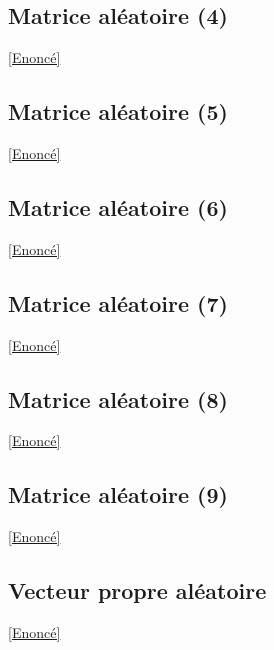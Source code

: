 \documentclass[8pt]{book}
\begin{document}
	\subsection{Matrice aléatoire (4)}
	\label{Matrice aléatoire 4 corrigé}
	\textcolor{blue}{\hyperref[Matrice aléatoire 4]{[Enoncé]}}\\
	
	\subsection{Matrice aléatoire (5)}
	\label{Matrice aléatoire 5 corrigé}
	\textcolor{blue}{\hyperref[Matrice aléatoire 5]{[Enoncé]}}\\
	
	\subsection{Matrice aléatoire (6)}
	\label{Matrice aléatoire 6 corrigé}
	\textcolor{blue}{\hyperref[Matrice aléatoire 6]{[Enoncé]}}\\
	
	\subsection{Matrice aléatoire (7)}
	\label{Matrice aléatoire 7 corrigé}
	\textcolor{blue}{\hyperref[Matrice aléatoire 7]{[Enoncé]}}\\
	
	\subsection{Matrice aléatoire (8)}
	\label{Matrice aléatoire 8 corrigé}
	\textcolor{blue}{\hyperref[Matrice aléatoire 8]{[Enoncé]}}\\
	
	\subsection{Matrice aléatoire (9)}
	\label{Matrice aléatoire (9) corrigé}
	\textcolor{blue}{\hyperref[Matrice aléatoire (9)]{[Enoncé]}}\\
	
	\subsection{Vecteur propre aléatoire}
	\label{Vecteur propre aléatoire corrigé}
	\textcolor{blue}{\hyperref[Vecteur propre aléatoire]{[Enoncé]}}\\
	
\end{document}
